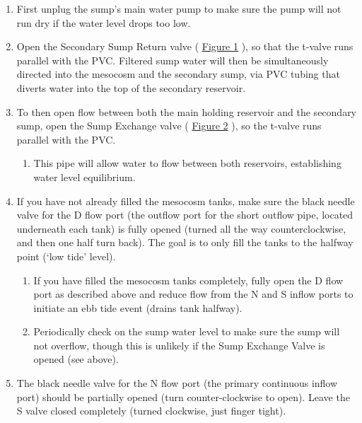 \documentclass[
]{book}
\providecommand{\tightlist}{%
  \setlength{\itemsep}{0pt}\setlength{\parskip}{0pt}}
\begin{document}
\begin{enumerate}
\def\labelenumi{\arabic{enumi}.}
\tightlist
\item
  First unplug the sump's main water pump to make sure the pump will not run dry if the water level drops too low.
\item
  Open the Secondary Sump Return valve ( \protect\hyperlink{Figure1}{Figure 1} ), so that the t-valve runs parallel with the PVC. Filtered sump water will then be simultaneously directed into the mesocosm and the secondary sump, via PVC tubing that diverts water into the top of the secondary reservoir.
\item
  To then open flow between both the main holding reservoir and the secondary sump, open the Sump Exchange valve ( \protect\hyperlink{Figure2}{Figure 2} ), so the t-valve runs parallel with the PVC.

  \begin{enumerate}
  \def\labelenumii{\arabic{enumii}.}
  \tightlist
  \item
    This pipe will allow water to flow between both reservoirs, establishing water level equilibrium.
  \end{enumerate}
\item
  If you have not already filled the mesocosm tanks, make sure the black needle valve for the D flow port (the outflow port for the short outflow pipe, located underneath each tank) is fully opened (turned all the way counterclockwise, and then one half turn back). The goal is to only fill the tanks to the halfway point (`low tide' level).

  \begin{enumerate}
  \def\labelenumii{\arabic{enumii}.}
  \tightlist
  \item
    If you have filled the mesocosm tanks completely, fully open the D flow port as described above and reduce flow from the N and S inflow ports to initiate an ebb tide event (drains tank halfway).
  \item
    Periodically check on the sump water level to make sure the sump will not overflow, though this is unlikely if the Sump Exchange Valve is opened (see above).
  \end{enumerate}
\item
  The black needle valve for the N flow port (the primary continuous inflow port) should be partially opened (turn counter-clockwise to open). Leave the S valve closed completely (turned clockwise, just finger tight).


\end{enumerate}
\end{document}
